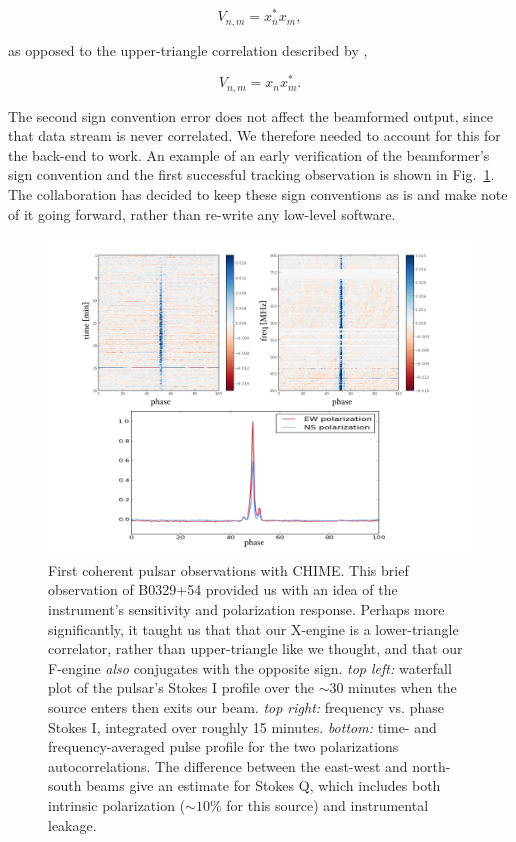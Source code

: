 \begin{equation}
V_{n, m} = x_n^* x_m,
\end{equation}

\noindent as opposed to the upper-triangle correlation described by 
\citet{2015arXiv150306203K}, 

\begin{equation}
V_{n, m} = x_n x_m^*.
\end{equation}

The second sign convention error does not affect the beamformed 
output, since that data stream is never correlated. We therefore 
needed to account for this for the back-end to work. An example 
of an early verification of the beamformer's sign convention 
and the first successful tracking observation is shown in Fig.~\ref{fig-bf_b0329}. 
The collaboration has decided to keep these sign conventions as is
and make note of it going forward, rather than re-write any low-level 
software.


\begin{figure}[!h]
\begin{center}
\includegraphics[trim={0.8in, 0in, 0in, 0in}, scale=0.5]{./figures/beamforming/b0329_testing.jpeg}
\caption[abc]{First coherent pulsar observations with CHIME. This 
brief observation of B0329+54 provided us with an idea 
of the instrument's sensitivity and polarization response. 
Perhaps more significantly, it taught us that 
that our X-engine is a lower-triangle correlator, rather than 
upper-triangle like we thought, and that our F-engine \textit{also}
conjugates with the opposite sign. \textit{top left:} waterfall plot
of the pulsar's Stokes I profile over the $\sim$30 minutes when the 
source enters then exits our beam. \textit{top right:} frequency 
vs. phase Stokes I, integrated over roughly 15 minutes. 
\textit{bottom:} time- and frequency-averaged pulse profile 
for the two polarizations autocorrelations. The difference between 
the east-west and north-south beams give an estimate for Stokes Q, which 
includes both intrinsic polarization ($\sim10\%$ for this source)
and instrumental leakage.} 
\label{fig-bf_b0329}
\vspace{0.4cm}   
\end{center}
\end{figure}


